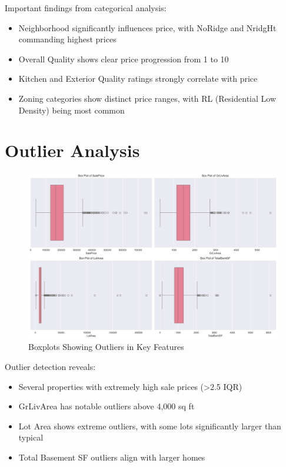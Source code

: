 \documentclass[12pt]{report}
\begin{document}
Important findings from categorical analysis:
\begin{itemize}
    \item Neighborhood significantly influences price, with NoRidge and NridgHt commanding highest prices
    \item Overall Quality shows clear price progression from 1 to 10
    \item Kitchen and Exterior Quality ratings strongly correlate with price
    \item Zoning categories show distinct price ranges, with RL (Residential Low Density) being most common
\end{itemize}

\section{Outlier Analysis}
\begin{figure}[H]
    \centering
    \includegraphics[width=1.0\textwidth]{figures/outliers_boxplot.png}
    \caption{Boxplots Showing Outliers in Key Features}
    \label{fig:outliers}
\end{figure}

Outlier detection reveals:
\begin{itemize}
    \item Several properties with extremely high sale prices (>2.5 IQR)
    \item GrLivArea has notable outliers above 4,000 sq ft
    \item Lot Area shows extreme outliers, with some lots significantly larger than typical
    \item Total Basement SF outliers align with larger homes
\end{itemize}
\end{document}

